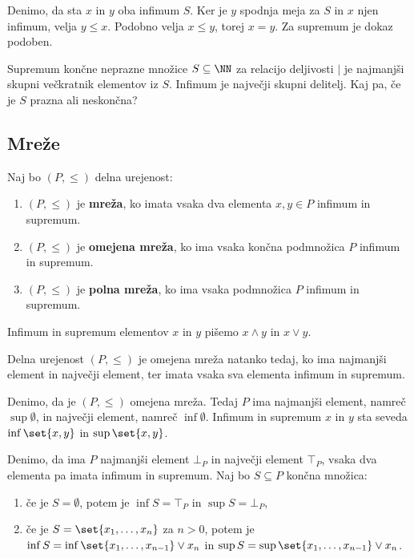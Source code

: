 \begin{dokaz}
  Denimo, da sta $x$ in $y$ oba infimum $S$. Ker je $y$ spodnja meja za
  $S$ in $x$ njen infimum, velja $y \leq x$. Podobno velja $x \leq y$, torej $x = y$. Za
  supremum je dokaz podoben.
\end{dokaz}

\begin{primer}
  Supremum končne neprazne množice $S \subseteq \NN$ za relacijo deljivosti $\mid$
  je najmanjši skupni večkratnik elementov iz $S$. Infimum je največji skupni
  delitelj. Kaj pa, če je $S$ prazna ali neskončna?
\end{primer}

\subsection{Mreže}

\begin{definicija}
  Naj bo $(P, {\leq})$ delna urejenost:
  \begin{enumerate}
  \item $(P, \leq)$ je \textbf{mreža}, ko imata vsaka dva elementa $x, y \in P$ infimum in supremum.

  \item $(P, \leq)$ je \textbf{omejena mreža}, ko ima vsaka končna podmnožica $P$ infimum in supremum.

  \item $(P, \leq)$ je \textbf{polna mreža}, ko ima vsaka podmnožica $P$ infimum in supremum.
  \end{enumerate}
  Infimum in supremum elementov $x$ in $y$ pišemo $x \land y$ in $x \lor y$.
\end{definicija}

\begin{izrek}
  Delna urejenost $(P, {\leq})$ je omejena mreža natanko tedaj, ko ima
  najmanjši element in največji element, ter imata vsaka sva elementa infimum in supremum.
\end{izrek}

\begin{dokaz}
  Denimo, da je $(P, \leq)$ omejena mreža. Tedaj $P$ ima najmanjši element, namreč
  $\sup \emptyset$, in največji element, namreč $\inf \emptyset$. Infimum in supremum $x$ in $y$ sta seveda $\inf \set{x, y}$ in $\sup \set{x, y}$.

  Denimo, da ima $P$ najmanjši element $\bot_P$ in največji element $\top_P$, vsaka dva
  elementa pa imata infimum in supremum. Naj bo $S \subseteq P$ končna množica:
  \begin{enumerate}
  \item če je $S = \emptyset$, potem je $\inf S = \top_P$ in $\sup S = \bot_P$,
  \item če je $S = \set{x_1, \ldots, x_n}$ za $n > 0$, potem je $\inf S = \inf \set{x_1, \ldots, x_{n-1}} \lor x_n$ in $\sup S = \sup \set{x_1, \ldots, x_{n-1}} \lor x_n$.
  \end{enumerate}
\end{dokaz}

